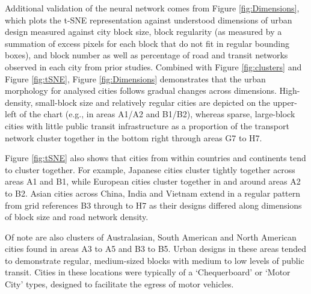 \documentclass[preprint,12pt]{elsarticle}
\begin{document}
Additional validation of the neural network comes from Figure \ref{fig:Dimensions}, which plots the t-SNE representation against understood dimensions of urban design measured against city block size, block regularity (as measured by a summation of excess pixels for each block that do not fit in regular bounding boxes), and block number as well as percentage of road and transit networks observed in each city from prior studies\cite{Thompson2020,Nice2019b}. Combined with Figure \ref{fig:clusters} and Figure \ref{fig:tSNE}, Figure \ref{fig:Dimensions} demonstrates that the urban morphology for analysed cities follows gradual changes across dimensions. High-density, small-block size and relatively regular cities are depicted on the upper-left of the chart (e.g., in areas A1/A2 and B1/B2), whereas sparse, large-block cities with little public transit infrastructure as a proportion of the transport network cluster together in the bottom right through areas G7 to H7. 

Figure \ref{fig:tSNE} also shows that cities from within countries and continents tend to cluster together. For example, Japanese cities cluster tightly together across areas A1 and B1, while European cities cluster together in and around areas A2 to B2. Asian cities across China, India and Vietnam extend in a regular pattern from grid references B3 through to H7 as their designs differed along dimensions of block size and road network density.

Of note are also clusters of Australasian, South American and North American cities found in areas A3 to A5 and B3 to B5. Urban designs in these areas tended to demonstrate regular, medium-sized blocks with medium to low levels of public transit. Cities in these locations were typically of a `Chequerboard' or `Motor City' types, designed to facilitate the egress of motor vehicles.
\end{document}
